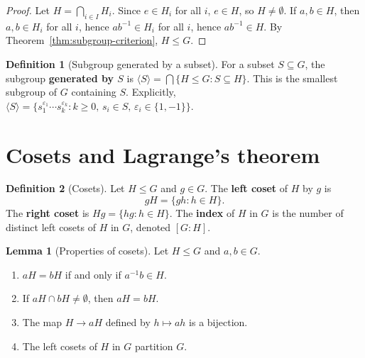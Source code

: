 \documentclass[12pt,a4paper,openany]{book}
\theoremstyle{definition}
\newtheorem{definition}{Definition}[chapter]
\newtheorem{lemma}{Lemma}[chapter]
\theoremstyle{remark}
\begin{document}
\begin{proof}
Let $H=\bigcap_{i\in I}H_i$.  Since $e\in H_i$ for all $i$, $e\in H$, so
$H\neq\emptyset$.  If $a,b\in H$, then $a,b\in H_i$ for all $i$, hence
$ab^{-1}\in H_i$ for all $i$, hence $ab^{-1}\in H$.  By
Theorem~\ref{thm:subgroup-criterion}, $H\le G$.
\end{proof}

\begin{definition}[Subgroup generated by a subset]
\label{def:generated-subgroup}
For a subset $S\subseteq G$, the subgroup \textbf{generated by $S$} is
$\langle S\rangle = \bigcap\{H\le G : S\subseteq H\}$.  This is the
smallest subgroup of $G$ containing $S$.  Explicitly,
$\langle S\rangle = \{s_1^{\varepsilon_1}\cdots s_k^{\varepsilon_k}
: k\ge 0,\, s_i\in S,\, \varepsilon_i\in\{1,-1\}\}$.
\end{definition}

\section{Cosets and Lagrange's theorem}
\label{sec:ch2-lagrange}

\begin{definition}[Cosets]
\label{def:coset}
Let $H\le G$ and $g\in G$.  The \textbf{left coset} of
$H$ by $g$ is
\[
  gH = \{gh : h\in H\}.
\]
The \textbf{right coset} is $Hg=\{hg:h\in H\}$.  The
\textbf{index} of $H$ in $G$ is the number of
distinct left cosets of $H$ in $G$, denoted $[G:H]$\index{$[G:H]$}.
\end{definition}

\begin{lemma}[Properties of cosets]
\label{lem:coset-properties}
Let $H\le G$ and $a,b\in G$.
\begin{enumerate}[label=(\roman*)]
  \item $aH=bH$ if and only if $a^{-1}b\in H$.
  \item If $aH\cap bH\neq\emptyset$, then $aH=bH$.
  \item The map $H\to aH$ defined by $h\mapsto ah$ is a bijection.
  \item The left cosets of $H$ in $G$ partition $G$.
\end{enumerate}
\end{lemma}
\end{document}
